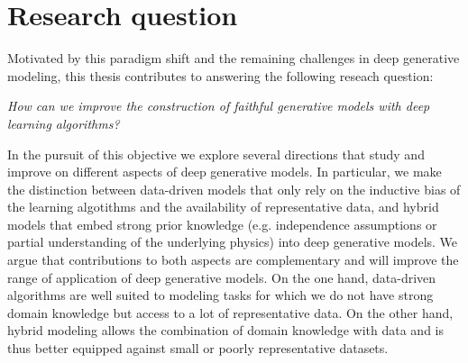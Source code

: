 \section{Research question}
Motivated by this paradigm shift and the remaining challenges in deep generative modeling, this thesis contributes to answering the following reseach question:
\begin{center}
  \textit{How can we improve the construction of faithful generative models with deep learning algorithms?}
\end{center}
In the pursuit of this objective we explore several directions that study and improve on different aspects of deep generative models. In particular, we make the distinction between data-driven models that only rely on the inductive bias of the learning algotithms and the availability of representative data, and hybrid models that embed strong prior knowledge (e.g. independence assumptions or partial understanding of the underlying physics) into deep generative models. We argue that contributions to both aspects are complementary and will improve the range of application of deep generative models. On the one hand, data-driven algorithms are well suited to modeling tasks for which we do not have strong domain knowledge but access to a lot of representative data. On the other hand, hybrid modeling allows the combination of domain knowledge with data and is thus better equipped against small or poorly representative datasets.





